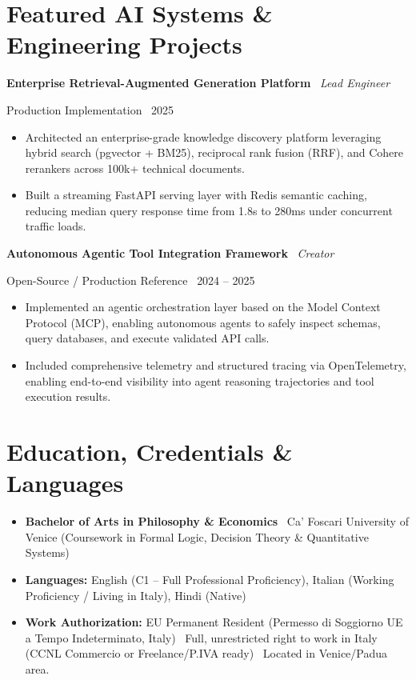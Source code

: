 \documentclass[a4paper,10pt]{article}
\newcommand{\role}[4]{%
  \vspace{2pt}\noindent
  \begin{minipage}[t]{0.70\textwidth}\raggedright\textbf{#1} \textbullet\ \textit{#3}\end{minipage}%
  \hfill
  \begin{minipage}[t]{0.28\textwidth}\raggedleft\footnotesize\color{gray}#2 \textbullet\ #4\end{minipage}%
  \vspace{1pt}%
}
\begin{document}
\section{Featured AI Systems \& Engineering Projects}

\role{Enterprise Retrieval-Augmented Generation Platform}{Production Implementation}{Lead Engineer}{2025}
\begin{itemize}
  \item Architected an enterprise-grade knowledge discovery platform leveraging hybrid search (pgvector + BM25), reciprocal rank fusion (RRF), and Cohere rerankers across 100k+ technical documents.
  \item Built a streaming FastAPI serving layer with Redis semantic caching, reducing median query response time from 1.8s to 280ms under concurrent traffic loads.
\end{itemize}

\role{Autonomous Agentic Tool Integration Framework}{Open-Source / Production Reference}{Creator}{2024 -- 2025}
\begin{itemize}
  \item Implemented an agentic orchestration layer based on the Model Context Protocol (MCP), enabling autonomous agents to safely inspect schemas, query databases, and execute validated API calls.
  \item Included comprehensive telemetry and structured tracing via OpenTelemetry, enabling end-to-end visibility into agent reasoning trajectories and tool execution results.
\end{itemize}

\section{Education, Credentials \& Languages}
\begin{itemize}
  \item \textbf{Bachelor of Arts in Philosophy \& Economics} \textbullet\ Ca' Foscari University of Venice (Coursework in Formal Logic, Decision Theory \& Quantitative Systems)
  \item \textbf{Languages:} English (C1 -- Full Professional Proficiency), Italian (Working Proficiency / Living in Italy), Hindi (Native)
  \item \textbf{Work Authorization:} EU Permanent Resident (Permesso di Soggiorno UE a Tempo Indeterminato, Italy) \textbullet\ Full, unrestricted right to work in Italy (CCNL Commercio or Freelance/P.IVA ready) \textbullet\ Located in Venice/Padua area.
\end{itemize}
\end{document}

